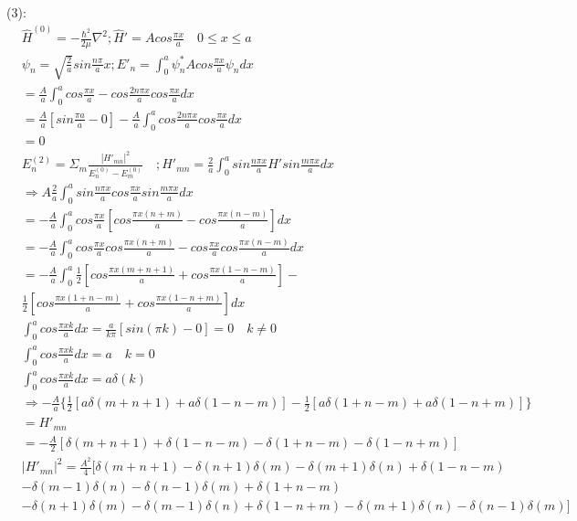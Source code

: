 \documentclass{article}
\begin{document}
  (3):
  \begin{align*}
  &\hat H^{(0)}=-\frac{\hbar^2}{2\mu}\nabla^2 ;\hat H'=Acos\frac{\pi x }a \quad 0\le x \le a\\
  &\psi_n=\sqrt{\frac2a}sin\frac{n\pi}ax;E'_n=\int^a_0 \psi^*_n Acos\frac{\pi x}a\psi_n dx \\
  &=\frac Aa\int^a_0 cos\frac{\pi x}a-cos\frac{2n\pi x}a cos\frac{\pi x}a dx \\
  &=\frac Aa[sin\frac{\pi a}a-0]-\frac Aa\int ^a_0 cos\frac{2n\pi x}acos\frac{\pi x}a dx \\
  &=0\\
  &E^{(2)}_n=\Sigma_m \frac{|H'_{mn}|^2}{E^{(0)}_n-E^{(0)}_m} \quad ;H'_{mn}= \frac2a\int^a_0sin\frac{n\pi x}a H' sin\frac{m\pi x}adx  \\
  &\Rightarrow A\frac2a\int^a_0 sin\frac{n\pi x}a cos\frac{\pi x}asin\frac{ m \pi x}a dx \\
  &=-\frac{A}a\int^a_0 cos\frac{\pi x}a [cos\frac{\pi x(n+m)}a-cos\frac{\pi x(n-m)}a]dx \\
  &=-\frac Aa\int^a_0 cos\frac{\pi x}acos\frac{\pi x(n+m)}a-cos\frac{ \pi x}acos\frac{ \pi x(n-m)}a dx \\
  &=-\frac Aa\int^a_0 \frac12[cos\frac{\pi x(m+n+1)}a+cos\frac{\pi x(1-n-m)}a]-\\ &\frac12[cos\frac{\pi x(1+n-m)}a+cos\frac{\pi x(1-n+m)}a]dx \\
  &\int ^a_0 cos\frac{ \pi x k}adx=\frac{a}{k\pi}[sin(\pi k)-0]=0\quad k\ne 0 \\
  & \int^a_0 cos\frac{\pi x k}a dx=a \quad k=0 \\
  &\int^a_0 cos\frac{\pi x k}adx= a\delta(k)\\
  &\Rightarrow -\frac Aa\{\frac12[ a \delta (m+n+1)+a \delta (1-n-m)] -\frac12[ a\delta (1+n-m)+ a \delta (1-n+m)]\}\\&=H'_{mn} \\
  &=-\frac{A}{2}[ \delta (m+n+1)+ \delta (1-n-m) - \delta (1+n-m)- \delta (1-n+m)] \\
  &|H'_{mn}|^2=\frac{A^2}4[ \delta (m+n+1)- \delta(n+1) \delta (m)- \delta (m+1) \delta (n)+ \delta (1-n-m)\\& - \delta (m-1) \delta (n)- \delta (n-1) \delta (m) + \delta (1+n-m) \\& - \delta (n+1) \delta (m)- \delta (m-1) \delta (n)+ \delta (1-n+m) - \delta (m+1) \delta (n)- \delta (n-1) \delta (m)]
  \end{align*}
\end{document}

